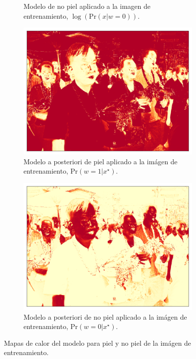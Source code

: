 \begin{figure}[h!]
\begin{subfigure}{0.4\textwidth}
        \caption{Modelo de no piel aplicado a la imagen de entrenamiento, $\log(\text{Pr}(x | w=0))$.}
        \label{fig:training_distbg}
    \end{subfigure}
    \begin{subfigure}{0.4\textwidth}
        \centering
        \includegraphics[width=\textwidth]{../figures/image1/image_01_postskin.png}
        \caption{Modelo a posteriori de piel aplicado a la imágen de entrenamiento, $\text{Pr}(w=1 | x^{\star})$.}
        \label{fig:training_postskin}
    \end{subfigure}
    \hspace{1cm}
    \begin{subfigure}{0.4\textwidth}
        \centering
        \includegraphics[width=\textwidth]{../figures/image1/image_01_postbg.png}
        \caption{Modelo a posteriori de no piel aplicado a la imágen de entrenamiento, $\text{Pr}(w=0 | x^{\star})$.}
        \label{fig:training_postbg}
    \end{subfigure}
    \caption{Mapas de calor del modelo para piel y no piel de la imágen de entrenamiento.}
    \label{fig:training}
\end{figure}

